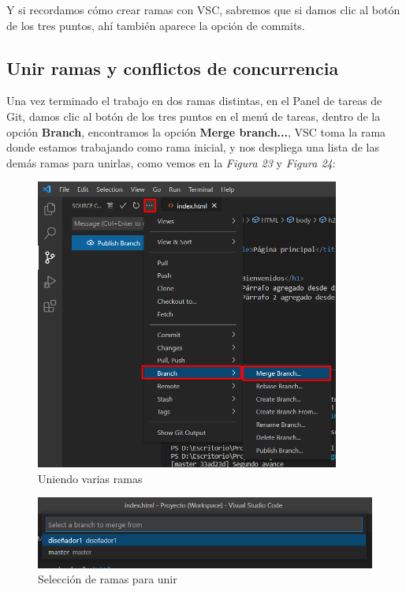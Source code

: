 Y si recordamos cómo crear ramas con VSC, sabremos que si damos clic al botón de los tres puntos, ahí también aparece la opción de commits.

\subsection{Unir ramas y conflictos de concurrencia}
\hspace{0.55cm}Una vez terminado el trabajo en dos ramas distintas, en el Panel de tareas de Git, damos clic al botón de los tres puntos en el menú de tareas, dentro de la opción \textbf{Branch}, encontramos la opción \textbf{Merge branch...}, VSC toma la rama donde estamos trabajando como rama inicial, y nos despliega una lista de las demás ramas para unirlas, como vemos en la \textit{Figura 23} y \textit{Figura 24}:
\begin{figure}[H]
    \begin{center}
        \caption{Uniendo varias ramas}
        \label{fig: 23}
        \includegraphics[width=10cm]{capturas/merge1.png}
    \end{center}
\end{figure}
\begin{figure}[H]
    \begin{center}
        \caption{Selección de ramas para unir}
        \label{fig: 24}
        \includegraphics[width=12cm]{capturas/merge2.png}
    \end{center}
\end{figure}

